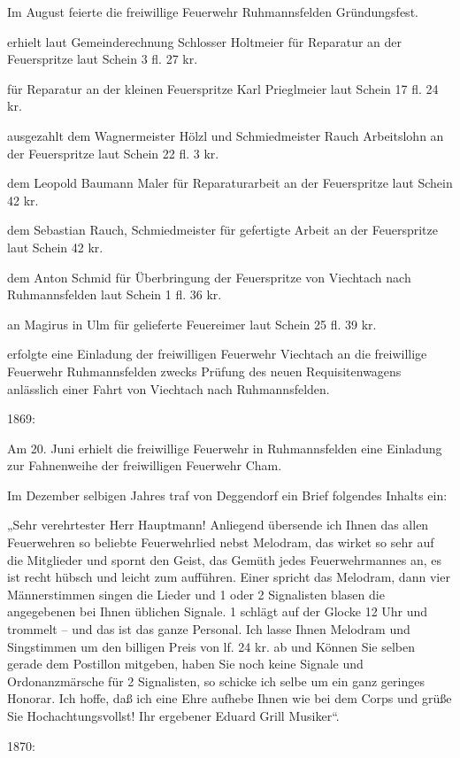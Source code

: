Im August feierte die freiwillige Feuerwehr Ruhmannsfelden Gründungsfest.

erhielt laut Gemeinderechnung Schlosser Holtmeier für Reparatur an der
Feuerspritze laut Schein 3 fl. 27 kr.

für Reparatur an der kleinen Feuerspritze Karl Prieglmeier laut Schein 17 fl. 24
kr.

ausgezahlt dem Wagnermeister Hölzl und Schmiedmeister Rauch Arbeitslohn an der
Feuerspritze laut Schein 22 fl. 3 kr.

dem Leopold Baumann Maler für Reparaturarbeit an der Feuerspritze laut Schein 42
kr.

dem Sebastian Rauch, Schmiedmeister für gefertigte Arbeit an der Feuerspritze
laut Schein 42 kr.

dem Anton Schmid für Überbringung der Feuerspritze von Viechtach nach
Ruhmannsfelden laut Schein 1 fl. 36 kr.

an Magirus in Ulm für gelieferte Feuereimer laut Schein 25 fl. 39 kr.

erfolgte eine Einladung der freiwilligen Feuerwehr Viechtach an die freiwillige
Feuerwehr Ruhmannsfelden zwecks Prüfung des neuen Requisitenwagens anlässlich
einer Fahrt von Viechtach nach Ruhmannsfelden.

1869:

Am 20. Juni erhielt die freiwillige Feuerwehr in Ruhmannsfelden eine Einladung
zur Fahnenweihe der freiwilligen Feuerwehr Cham.

Im Dezember selbigen Jahres traf von Deggendorf ein Brief folgendes Inhalts ein:

„Sehr verehrtester Herr Hauptmann! Anliegend übersende ich Ihnen das allen
Feuerwehren so beliebte Feuerwehrlied nebst Melodram, das wirket so sehr auf die
Mitglieder und spornt den Geist, das Gemüth jedes Feuerwehrmannes an, es ist
recht hübsch und leicht zum aufführen. Einer spricht das Melodram, dann vier
Männerstimmen singen die Lieder und 1 oder 2 Signalisten blasen die angegebenen
bei Ihnen üblichen Signale. 1 schlägt auf der Glocke 12 Uhr und trommelt – und
das ist das ganze Personal. Ich lasse Ihnen Melodram und Singstimmen um den
billigen Preis von lf. 24 kr. ab und Können Sie selben gerade dem Postillon
mitgeben, haben Sie noch keine Signale und Ordonanzmärsche für 2 Signalisten, so
schicke ich selbe um ein ganz geringes Honorar. Ich hoffe, daß ich eine Ehre
aufhebe Ihnen wie bei dem Corps und grüße Sie Hochachtungsvollst! Ihr ergebener
Eduard Grill Musiker“.

1870:

